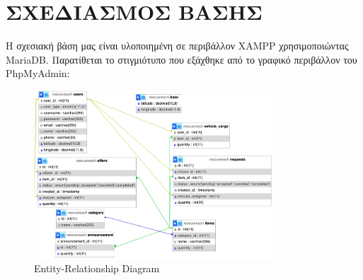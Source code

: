 \chapter{ΣΧΕΔΙΑΣΜΟΣ ΒΑΣΗΣ}
    Η σχεσιακή βάση μας είναι υλοποιημένη σε περιβάλλον XAMPP χρησιμοποιώντας MariaDB.
    Παρατίθεται το στιγμιότυπο που εξάχθηκε από το γραφικό περιβάλλον του PhpMyAdmin:

    \begin{figure}[h!] \noindent \centering
        \includegraphics[width=0.8\textwidth]{img/sxesiakivash}
        \caption{Entity-Relationship Diagram}
    \end{figure}

